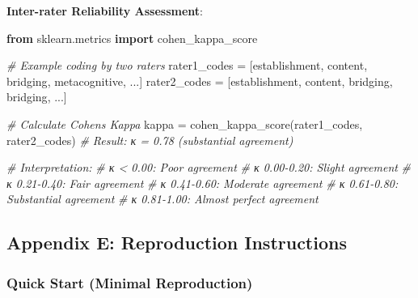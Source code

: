 \documentclass[
  11pt]{article}
\newenvironment{Shaded}{}{}
\newcommand{\CommentTok}[1]{\textcolor[rgb]{0.38,0.63,0.69}{\textit{#1}}}
\newcommand{\ImportTok}[1]{\textcolor[rgb]{0.00,0.50,0.00}{\textbf{#1}}}
\newcommand{\NormalTok}[1]{#1}
\newcommand{\OperatorTok}[1]{\textcolor[rgb]{0.40,0.40,0.40}{#1}}
\newcommand{\StringTok}[1]{\textcolor[rgb]{0.25,0.44,0.63}{#1}}
\begin{document}
\textbf{Inter-rater Reliability Assessment}:

\begin{Shaded}
\begin{Highlighting}[]
\ImportTok{from}\NormalTok{ sklearn.metrics }\ImportTok{import}\NormalTok{ cohen\_kappa\_score}

\CommentTok{\# Example coding by two raters}
\NormalTok{rater1\_codes }\OperatorTok{=}\NormalTok{ [}\StringTok{\textquotesingle{}establishment\textquotesingle{}}\NormalTok{, }\StringTok{\textquotesingle{}content\textquotesingle{}}\NormalTok{, }\StringTok{\textquotesingle{}bridging\textquotesingle{}}\NormalTok{, }\StringTok{\textquotesingle{}metacognitive\textquotesingle{}}\NormalTok{, ...]}
\NormalTok{rater2\_codes }\OperatorTok{=}\NormalTok{ [}\StringTok{\textquotesingle{}establishment\textquotesingle{}}\NormalTok{, }\StringTok{\textquotesingle{}content\textquotesingle{}}\NormalTok{, }\StringTok{\textquotesingle{}bridging\textquotesingle{}}\NormalTok{, }\StringTok{\textquotesingle{}bridging\textquotesingle{}}\NormalTok{, ...]}

\CommentTok{\# Calculate Cohen\textquotesingle{}s Kappa}
\NormalTok{kappa }\OperatorTok{=}\NormalTok{ cohen\_kappa\_score(rater1\_codes, rater2\_codes)}
\CommentTok{\# Result: κ = 0.78 (substantial agreement)}

\CommentTok{\# Interpretation:}
\CommentTok{\# κ \textless{} 0.00: Poor agreement}
\CommentTok{\# κ 0.00{-}0.20: Slight agreement}
\CommentTok{\# κ 0.21{-}0.40: Fair agreement}
\CommentTok{\# κ 0.41{-}0.60: Moderate agreement}
\CommentTok{\# κ 0.61{-}0.80: Substantial agreement}
\CommentTok{\# κ 0.81{-}1.00: Almost perfect agreement}
\end{Highlighting}
\end{Shaded}

\subsection{Appendix E: Reproduction
Instructions}\label{appendix-e-reproduction-instructions}

\subsubsection{Quick Start (Minimal
Reproduction)}\label{quick-start-minimal-reproduction}
\end{document}
